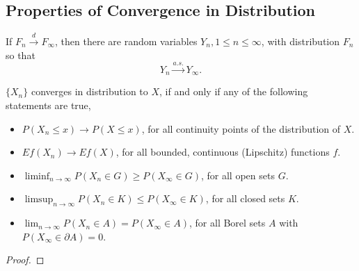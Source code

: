 \subsection{Properties of Convergence in Distribution}

\begin{lemma} \label{lem:distribution-to-probability}
    If $F_n\stackrel{d}{\rightarrow}F_\infty$, then there are random variables $Y_n,1\leq n\leq \infty$, with distribution $F_n$ so that
    \begin{equation}
        Y_n\stackrel{a.s.}{\rightarrow}Y_\infty.
    \end{equation}
\end{lemma}

\begin{theorem} \label{thm:portmanteau-lemma}
    $\{X_n\}$ converges in distribution to $X$, if and only if any of the following statements are true,
    \begin{itemize}
        \item $P(X_n\leq x)\rightarrow P(X\leq x)$, for all continuity points of the distribution of $X$.
        \item $Ef(X_n)\rightarrow Ef(X)$, for all bounded, continuous (Lipschitz) functions $f$.
        \item $\liminf_{n\rightarrow\infty}P\left(X_{n} \in G\right)\geq P\left(X_{\infty}\in G\right)$, for all open sets $G$.
        \item $\limsup_{n \rightarrow\infty}P\left(X_{n} \in K\right) \leq P\left(X_{\infty} \in K\right)$, for all closed sets $K$.
        \item $\lim_{n\rightarrow\infty}P\left(X_{n}\in A\right)=P\left(X_{\infty}\in A\right)$, for all Borel sets $A$ with $P\left(X_{\infty}\in \partial A\right)=0$.
    \end{itemize}
\end{theorem}

\begin{proof}

\end{proof}

